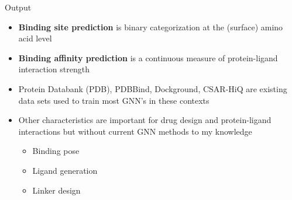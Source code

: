 \documentclass{beamer}
\begin{document}
\begin{frame}{Output}
    \begin{itemize}
        \item {\bf Binding site prediction} is binary categorization at the (surface) amino acid level 
        \item {\bf Binding affinity prediction} is a continuous measure of protein-ligand interaction strength 
        \item Protein Databank (PDB), PDBBind, Dockground, CSAR-HiQ are existing data sets used to train most GNN's in these contexts 
        \item Other characteristics are important for drug design and protein-ligand interactions but without current GNN methods to my knowledge 
        \begin{itemize}
            \item Binding pose 
            \item Ligand generation 
            \item Linker design 
        \end{itemize}
    \end{itemize}
\end{frame}
\end{document}
